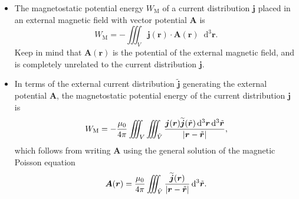\documentclass[11pt, a4paper]{article}
\newcommand{\diff}{\mathop{}\!\mathrm{d}} %
\newcommand{\dr}{\diff^{3} \r}  %
\newcommand{\dtr}{\diff^{3} \tilde{\r}}  %
\renewcommand{\vec}[1]{\bm{#1}} %
\renewcommand{\t}[1]{\tilde{#1}} %
\renewcommand{\r}{\vec{r}}
\newcommand{\A}{\vec{A}} %
\newcommand{\mm}{\mu_{0}}  %
\renewcommand{\j}{\vec{j}}  %
\begin{document}
\begin{itemize}
    \item The magnetostatic potential energy $ W_{\text{M}} $ of a current distribution $ \j $ placed in an external magnetic field with vector potential $ \A $ is
    \begin{equation*}
        W_{\text{M}} = - \iiint_{V} \j(\r)\cdot \A(\r) \dr.
    \end{equation*}
    Keep in mind that $ \A(\r) $ is the potential of the external magnetic field, and is completely unrelated to the current distribution $ \j $.

    \item In terms of the external current distribution $ \widetilde{\j} $ generating the external potential $ \A $, the magnetostatic potential energy of the current distribution $ \j $ is
    \begin{equation*}
		W_{\text{M}} = - \frac{\mm}{4\pi} \iiint_{V} \iiint_{\tilde{V}} \frac{\j(\r) \widetilde{\j}(\tilde{\r}) \dr \dtr}{\abs{\r - \tilde{\r}}},
    \end{equation*}
    which follows from writing $ \A $ using the general solution of the magnetic Poisson equation
	\begin{equation*}
		\A(\r) = \frac{\mm}{4\pi}\iiint_{\tilde{V}}\frac{\widetilde{\j}(\r)}{\abs{\r - \t{\r}}} \dtr.
	\end{equation*}
    
\end{itemize}
\end{document}

